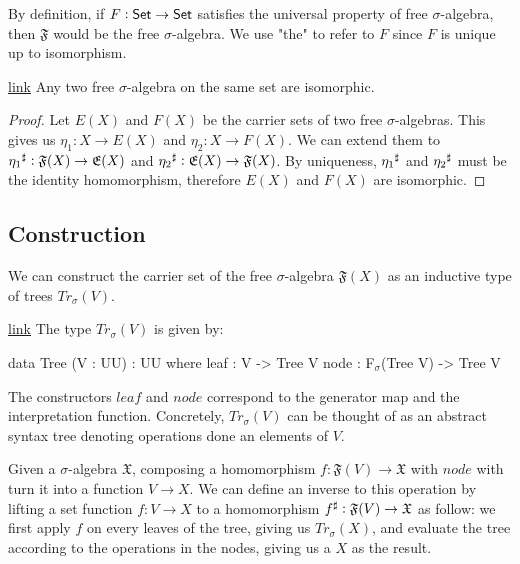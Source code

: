 By definition, if $F : \mathsf{Set} \to \mathsf{Set}$ satisfies the universal property of
free $\sigma$-algebra, then $\mathfrak{F}$ would be the free $\sigma$-algebra.
We use "the" to refer to $F$ since $F$ is unique up to isomorphism. 

\begin{lemma}{\href{https://windtfw.com/agda-symmetries/Cubical.Structures.Free.html#2216}{link}}\label{lem:free-algebras-unique}
Any two free $\sigma$-algebra on the same set are isomorphic.
\end{lemma}
\begin{proof}
Let $E(X)$ and $F(X)$ be the carrier sets of two free $\sigma$-algebras.
This gives us $\eta_1 : X \to E(X)$ and $\eta_2 : X \to F(X)$.
We can extend them to ${\eta_1}^{\sharp} : \mathfrak{F}(X) \to \mathfrak{E}(X)$
and  ${\eta_2}^{\sharp} : \mathfrak{E}(X) \to \mathfrak{F}(X)$. By uniqueness,
${\eta_1}^{\sharp}$ and ${\eta_2}^{\sharp}$ must be the identity homomorphism,
therefore $E(X)$ and $F(X)$ are isomorphic.
\end{proof}

\subsection{Construction}
We can construct the carrier set of the free $\sigma$-algebra
$\mathfrak{F}(X)$ as an inductive type of trees $Tr_\sigma(V)$.
\newpage
\begin{definition}{\href{https://windtfw.com/agda-symmetries/Cubical.Structures.Tree.html#610}{link}}
The type $Tr_\sigma(V)$ is given by:
\begin{code}
data Tree (V : UU) : UU where
    leaf : V -> Tree V
    node : F$_\sigma$(Tree V) -> Tree V
\end{code}
\end{definition}

The constructors $leaf$ and $node$ correspond to the generator map
and the interpretation function. Concretely, $Tr_\sigma(V)$ can
be thought of as an abstract syntax tree denoting operations done
an elements of $V$. 

Given a $\sigma$-algebra $\mathfrak{X}$, composing a homomorphism
$f : \mathfrak{F}(V) \to \mathfrak{X}$ with $node$ with turn it
into a function $V \to X$.
We can define an inverse to this operation by lifting a set function
$f : V \to X$ to a homomorphism ${f}^{\sharp} : \mathfrak{F}(V) \to \mathfrak{X}$
as follow: we first apply $f$ on every leaves of the tree, giving us
$Tr_\sigma(X)$, and evaluate the tree according to the operations
in the nodes, giving us a $X$ as the result.


